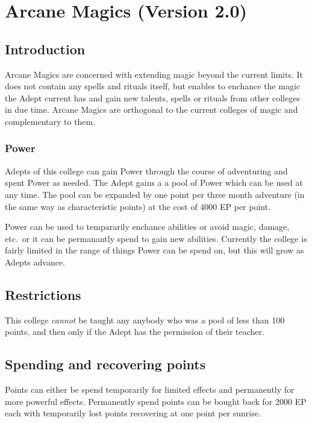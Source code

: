 \documentclass[a4paper]{article}
\begin{document}
\section{Arcane Magics (Version 2.0)}

\begin{multicols}{2}

\subsection{Introduction}

Arcane Magics are concerned with extending magic beyond the current
limits.  It does not contain any spells and rituals itself, but
enables to enchance the magic the Adept current has and gain new
talents, spells or rituals from other colleges in due time.  Arcane
Magics are orthogonal to the current colleges of magic and
complementary to them.

\subsubsection{Power}

Adepts of this college can gain Power through the course of
adventuring and spent Power as needed.  The Adept gains a a pool of
Power which can be used at any time.  The pool can be expanded by one
point per three month adventure (in the same way as characteristic
points) at the cost of 4000 EP per point.

Power can be used to tempararily enchance abilities or avoid magic,
damage, etc.\ or it can be permanantly spend to gain new abilities.
Currently the college is fairly limited in the range of things Power
can be spend on, but this will grow as Adepts advance.

\subsection{Restrictions}

This college \emph{cannot} be taught any anybody who was a pool of
less than 100 points, and then only if the Adept has the permission of
their teacher.

\subsection{Spending and recovering points}

Points can either be spend temporarily for limited effects and
permanently for more powerful effects.  Permanently spend points
can be bought back for 2000 EP each with temporarily lost points
recovering at one point per sunrise.


\end{multicols}
\end{document}

